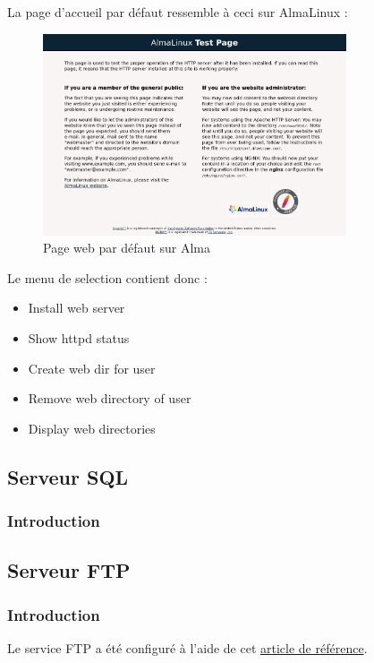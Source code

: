 \documentclass{article}
\begin{document}
	La page d'accueil par défaut ressemble à ceci sur AlmaLinux :
		\begin{figure}[h]
		\centering
		\includegraphics[width=0.8\textwidth]{webservdefault.png}
		 \caption{Page web par défaut sur Alma}
		\label{fig:your_label}
	\end{figure}
	
	Le menu de selection contient donc :
	\begin{itemize}
		\item Install web server
		\item Show httpd status
		\item Create web dir for user
		\item Remove web directory of user
		\item Display web directories
	\end{itemize}
	
	\newpage
	
	\subsection{Serveur SQL}
	\subsubsection{Introduction}

	\subsection{Serveur FTP}
	\subsubsection{Introduction}
	Le service FTP a été configuré à l'aide de cet \href{https://doc.fedora-fr.org/wiki/Vsftpd_:_Installation_et_configuration}{article de référence}.
\end{document}
